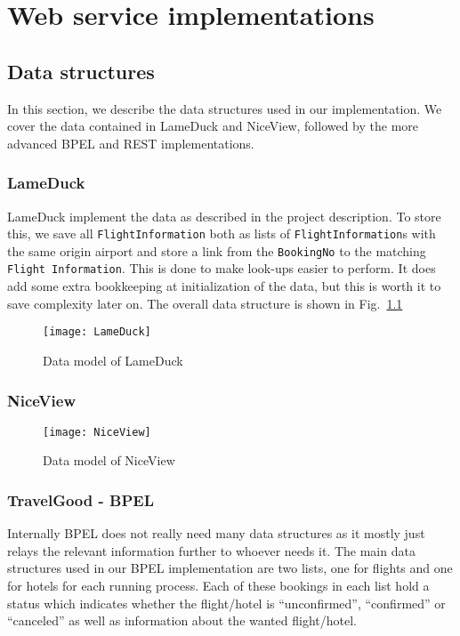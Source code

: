 {\setlength{\chapterfontsize}{23pt}
\chapter{Web service implementations}
}

\section{Data structures}
In this section, we describe the data structures used in our implementation. We cover the data contained in LameDuck and NiceView, followed by the more advanced BPEL and REST implementations.

\subsection{LameDuck}
LameDuck implement the data as described in the project description. To store this, we save all \texttt{FlightInformation} both as lists of \texttt{FlightInformation}s with the same origin airport and store a link from the \texttt{BookingNo} to the matching \texttt{Flight Information}. This is done to make look-ups easier to perform. It does add some extra bookkeeping at initialization of the data, but this is worth it to save complexity later on. The overall data structure is shown in Fig.~\ref{fig:lameduck_class}

\begin{figure}[H]
\centering
\texttt{[image: LameDuck]}
\caption{Data model of LameDuck}
\label{fig:lameduck_class}
\end{figure}


\subsection{NiceView}
\begin{figure}[H]
\centering
\texttt{[image: NiceView]}
\caption{Data model of NiceView}
\label{fig:niceview_class}
\end{figure}

\subsection{TravelGood - BPEL}
Internally BPEL does not really need many data structures as it mostly just relays the relevant information further to whoever needs it. The main data structures used in our BPEL implementation are two lists, one for flights and one for hotels for each running process. Each of these bookings in each list hold a status which indicates whether the flight/hotel is ``unconfirmed'', ``confirmed'' or ``canceled'' as well as information about the wanted flight/hotel.

